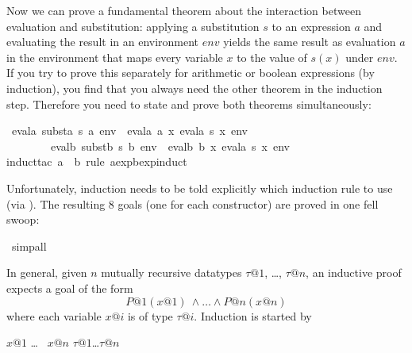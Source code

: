 \begin{isabellebody}
\begin{isamarkuptext}
Now we can prove a fundamental theorem about the interaction between
evaluation and substitution: applying a substitution $s$ to an expression $a$
and evaluating the result in an environment $env$ yields the same result as
evaluation $a$ in the environment that maps every variable $x$ to the value
of $s(x)$ under $env$. If you try to prove this separately for arithmetic or
boolean expressions (by induction), you find that you always need the other
theorem in the induction step. Therefore you need to state and prove both
theorems simultaneously:%
\end{isamarkuptext}%
\isamarkuptrue%
\isamarkupfalse%
\ {\isachardoublequoteopen}evala\ {\isacharparenleft}substa\ s\ a{\isacharparenright}\ env\ {\isacharequal}\ evala\ a\ {\isacharparenleft}{\isasymlambda}x{\isachardot}\ evala\ {\isacharparenleft}s\ x{\isacharparenright}\ env{\isacharparenright}\ {\isasymand}\isanewline
\ \ \ \ \ \ \ \ evalb\ {\isacharparenleft}substb\ s\ b{\isacharparenright}\ env\ {\isacharequal}\ evalb\ b\ {\isacharparenleft}{\isasymlambda}x{\isachardot}\ evala\ {\isacharparenleft}s\ x{\isacharparenright}\ env{\isacharparenright}{\isachardoublequoteclose}\isanewline
%
\isadelimproof
%
\endisadelimproof
%
\isatagproof
{}\isamarkupfalse%
{\isacharparenleft}induct{\isacharunderscore}tac\ a\ \ b\ rule{\isacharcolon}\ aexp{\isacharunderscore}bexp{\isachardot}induct{\isacharparenright}%
\begin{isamarkuptxt}%
\noindent Unfortunately, induction needs to be told explicitly which induction rule to use (via ).
The resulting 8 goals (one for each constructor) are proved in one fell swoop:%
\end{isamarkuptxt}%
\isamarkuptrue%
\isamarkupfalse%
\ simp{\isacharunderscore}all%
\endisatagproof
{\isafoldproof}%
%
\isadelimproof
%
\endisadelimproof
%
\begin{isamarkuptext}%
In general, given $n$ mutually recursive datatypes $\tau@1$, \dots, $\tau@n$,
an inductive proof expects a goal of the form
\[ P@1(x@1)\ \land \dots \land P@n(x@n) \]
where each variable $x@i$ is of type $\tau@i$. Induction is started by
\begin{isabelle}
 $x@1$  \dots\  $x@n$  $\tau@1$\isa{{\isacharunderscore}}\dots\isa{{\isacharunderscore}}$\tau@n$
\end{isabelle}


\end{isamarkuptext}
\end{isabellebody}
